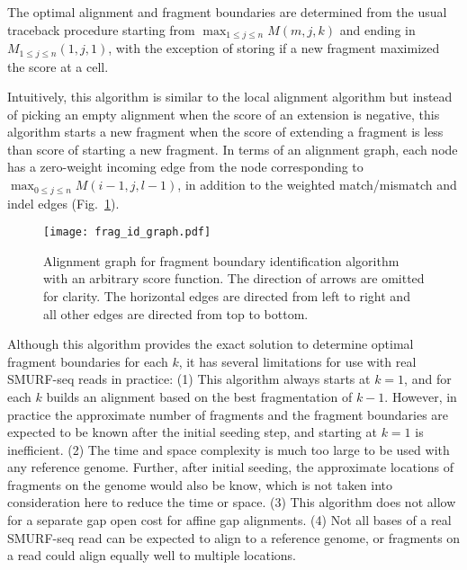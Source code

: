 The optimal alignment and fragment boundaries are determined from the
usual traceback procedure starting from $\max_{1 \leq j \leq n}M(m,j,k)$
and ending in $M_{1 \leq j \leq n}(1,j,1)$, with the exception of
storing if a new fragment maximized the score at a cell.

Intuitively, this algorithm is similar to the local alignment algorithm
but instead of picking an empty alignment when the score of an extension
is negative, this algorithm starts a new fragment when the score of
extending a fragment is less than score of starting a new fragment. In
terms of an alignment graph, each node has a zero-weight incoming edge
from the node corresponding to $\max_{0 \leq j \leq n}M(i-1,j,l-1)$, in
addition to the weighted match/mismatch and indel edges
(Fig.~\ref{frag_alg}).

\begin{figure}[h!]
\centering
\texttt{[image: frag\_id\_graph.pdf]}
\caption[Alignment graph for fragment boundary identification algorithm
  with an arbitrary score function]{
  Alignment graph for fragment boundary identification algorithm
  with an arbitrary score function. The direction of arrows are omitted
  for clarity. The horizontal edges are directed from left to right and
  all other edges are directed from top to bottom.}
\label{frag_alg}
\end{figure}

Although this algorithm provides the exact solution to determine optimal
fragment boundaries for each $k$, it has several limitations for use
with real SMURF-seq reads in practice:
(1) This algorithm always starts at $k=1$, and for each $k$ builds an
alignment based on the best fragmentation of $k-1$.
However, in practice the approximate number of fragments and the
fragment boundaries are expected to be known after the initial seeding
step, and starting at $k=1$ is inefficient.
(2) The time and space complexity is much too large to be used with any
reference genome. Further, after initial seeding, the approximate
locations of fragments on the genome would also be know, which is not
taken into consideration here to reduce the time or space.
(3) This algorithm does not allow for a separate gap open cost for
affine gap alignments.
(4) Not all bases of a real SMURF-seq read can be expected to align to a
reference genome, or fragments on a read could align equally well to
multiple locations.

